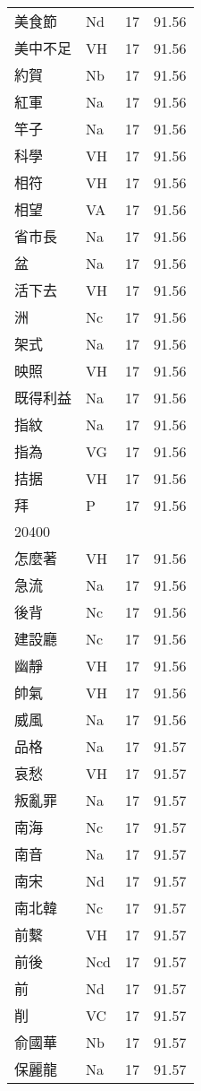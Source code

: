 \documentclass[twocolumn]{book}
\begin{document}
\begin{supertabular}{llrr}
美食節 & Nd & 17 &  91.56\\
美中不足 & VH & 17 &  91.56\\
約賀 & Nb & 17 &  91.56\\
紅軍 & Na & 17 &  91.56\\
竿子 & Na & 17 &  91.56\\
科學 & VH & 17 &  91.56\\
相符 & VH & 17 &  91.56\\
相望 & VA & 17 &  91.56\\
省市長 & Na & 17 &  91.56\\
盆 & Na & 17 &  91.56\\
活下去 & VH & 17 &  91.56\\
洲 & Nc & 17 &  91.56\\
架式 & Na & 17 &  91.56\\
映照 & VH & 17 &  91.56\\
既得利益 & Na & 17 &  91.56\\
指紋 & Na & 17 &  91.56\\
指為 & VG & 17 &  91.56\\
拮据 & VH & 17 &  91.56\\
拜 & P & 17 &  91.56\\
20400\\
怎麼著 & VH & 17 &  91.56\\
急流 & Na & 17 &  91.56\\
後背 & Nc & 17 &  91.56\\
建設廳 & Nc & 17 &  91.56\\
幽靜 & VH & 17 &  91.56\\
帥氣 & VH & 17 &  91.56\\
威風 & Na & 17 &  91.56\\
品格 & Na & 17 &  91.57\\
哀愁 & VH & 17 &  91.57\\
叛亂罪 & Na & 17 &  91.57\\
南海 & Nc & 17 &  91.57\\
南音 & Na & 17 &  91.57\\
南宋 & Nd & 17 &  91.57\\
南北韓 & Nc & 17 &  91.57\\
前繫 & VH & 17 &  91.57\\
前後 & Ncd & 17 &  91.57\\
前 & Nd & 17 &  91.57\\
削 & VC & 17 &  91.57\\
俞國華 & Nb & 17 &  91.57\\
保麗龍 & Na & 17 &  91.57\\

\end{supertabular}
\end{document}
